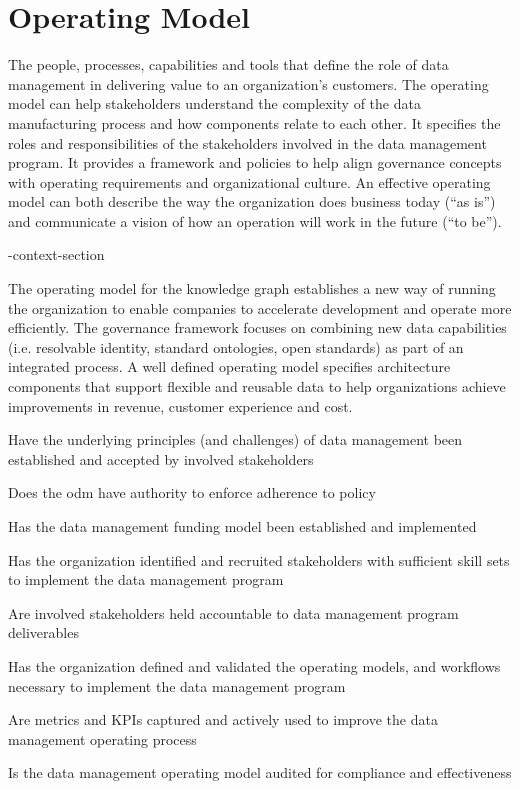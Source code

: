 \section{Operating Model}\label{sec:ekgmm-b-4-1} %

The people, processes, capabilities and tools that define the role of data management in delivering value to an
organization’s customers.
The operating model can help stakeholders understand the complexity of the data manufacturing process and how
components relate to each other.
It specifies the roles and responsibilities of the stakeholders involved in the data management program.
It provides a framework and policies to help align governance concepts with operating requirements and
organizational culture.
An effective operating model can both describe the way the organization does business today (“as is”) and
communicate a vision of how an operation will work in the future (“to be”).

\ekgmm-context-section

The operating model for the knowledge graph establishes a new way of running the organization to enable companies to
accelerate development and operate more efficiently.
The  governance framework focuses on combining new data capabilities (i.e. resolvable identity,
standard ontologies, open standards) as part of an integrated process.
A well defined operating model specifies architecture components that support flexible and reusable data to help
organizations achieve improvements in revenue, customer experience and cost.

\kgmmcorequestionssection

\begin{core-questions}

  \item [\thesection.1] Have the underlying principles (and challenges) of data management been established and
                        accepted by involved stakeholders
  \item [\thesection.2] Does the \gls{odm} have authority to enforce adherence to policy
  \item [\thesection.3] Has the data management funding model been established and implemented
  \item [\thesection.4] Has the organization identified and recruited stakeholders with sufficient skill sets to
                        implement the data management program
  \item [\thesection.5] Are involved stakeholders held accountable to data management program deliverables
  \item [\thesection.6] Has the organization defined and validated the operating models, and workflows necessary to
                        implement the data management program
  \item [\thesection.7] Are metrics and KPIs captured and actively used to improve the data management operating process
  \item [\thesection.8] Is the data management operating model audited for compliance and effectiveness

\end{core-questions}

